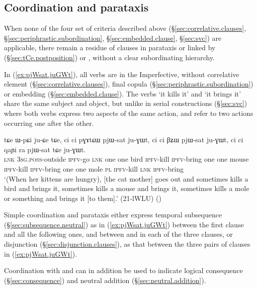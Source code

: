\subsection{Coordination and parataxis} \label{sec:coordination}
When none of the four set of criteria described above (§\ref{sec:correlative.clauses}, §\ref{sec:periphrastic.subordination}, §\ref{sec:embedded.clause}, §\ref{sec:svc}) are applicable, there remain a residue of clauses in parataxis or linked by  (§\ref{sec:tCe.postposition}) or , without a clear subordinating hierarchy. 

In (\ref{ex:pjWsat.juGWt}), all verbs are in the Imperfective, without correlative element (§\ref{sec:correlative.clauses}), final copula (§\ref{sec:periphrastic.subordination}) or embedding (§\ref{sec:embedded.clause}). The verbs  `it kills it' and  `it brings it' share the same subject and object, but unlike in serial constructions (§\ref{sec:svc}) where both verbs express two aspects of the same action,  and  refer to two actions occurring one after the other.


\begin{exe}
\ex \label{ex:pjWsat.juGWt}
\gll tɕe ɯ-pɕi ju-ɕe tɕe, ci ci pɣɤtɕɯ pjɯ-sat ju-ɣɯt, ci ci βʑɯ pjɯ-sat ju-ɣɯt, ci ci qaɲi ra pjɯ-sat tɕe ju-ɣɯt. \\
\textsc{lnk} \textsc{3sg}.\textsc{poss}-outside \textsc{ipfv}-go \textsc{lnk} one one bird \textsc{ipfv}-kill \textsc{ipfv}-bring one one mouse \textsc{ipfv}-kill \textsc{ipfv}-bring one one mole \textsc{pl} \textsc{ipfv}-kill \textsc{lnk} \textsc{ipfv}-bring \\
\glt `(When her kittens are hungry), [the cat mother] goes out and sometimes kills a bird and brings it, sometimes kills a mouse and brings it, sometimes kills a mole or something and brings it [to them].' (21-lWLU)
()
\end{exe}

Simple coordination and parataxis either express temporal subsequence (§\ref{sec:subsequence.neutral}) as in (\ref{ex:pjWsat.juGWt}) between the first clause and all the following ones, and between  and  in each of the three clauses, or disjunction (§\ref{sec:disjunction.clauses}), as that between the three pairs of clauses in (\ref{ex:pjWsat.juGWt}). 

Coordination with  and  can in addition be used to indicate logical consequence (§\ref{sec:consequence}) and neutral addition (§\ref{sec:neutral.addition}).

